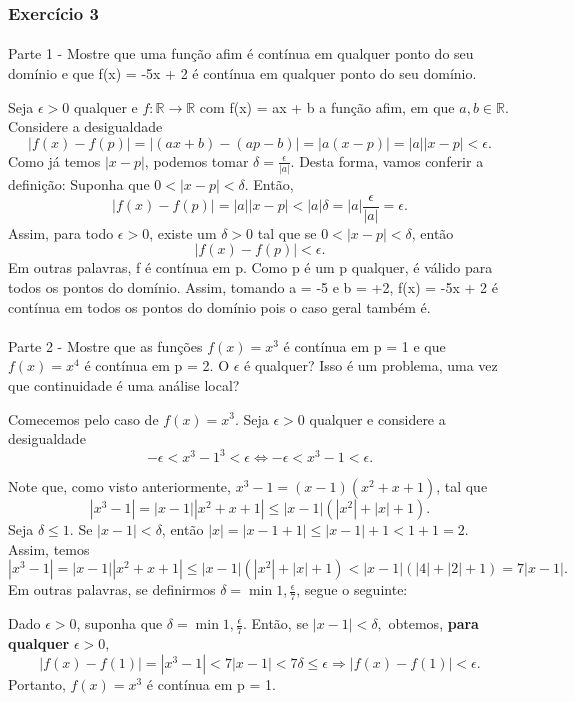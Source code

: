\documentclass[exercícios_de_cálculo.tex]{subfiles}
\begin{document}
\subsubsection{Exercício 3}
\paragraph{} Parte 1 - Mostre que uma função afim é contínua em qualquer ponto do seu dom\'inio e que f(x) = -5x + 2 é cont\'inua em qualquer ponto do seu dom\'inio.
\begin{proof*}
	Seja $\epsilon > 0$ qualquer e $f:\mathbb{R}\rightarrow\mathbb{R}$ com f(x) = ax + b a função afim, em que $a, b\in\mathbb{R}$. Considere a desigualdade
	$$
		|f(x) - f(p)| = |(ax + b) - (ap - b)| = |a(x - p)| = |a||x - p|< \epsilon.
	$$
	Como já temos $|x - p|$, podemos tomar $\delta = \frac{\epsilon}{|a|}.$ Desta forma, vamos conferir a definição: Suponha que $0 < |x - p| < \delta.$ Então,
	$$
		|f(x) - f(p)| = |a||x - p| < |a|\delta = |a|\frac{\epsilon}{|a|} = \epsilon.
	$$
	Assim, para todo $\epsilon > 0$, existe um $\delta > 0$ tal que se $0 < |x - p| < \delta$, então
	$$
		|f(x) - f(p)| < \epsilon.
	$$
	Em outras palavras, f é contínua em p. Como p é um p qualquer, é válido para todos os pontos do dom\'inio. Assim, tomando a = -5 e b = +2, f(x) = -5x + 2 é cont\'inua em todos os pontos do dom\'inio pois o caso geral também é.

	\qedsymbol
\end{proof*}

\paragraph{} Parte 2 - Mostre que as funções $f(x) = x^3$ é contínua em p = 1 e que $f(x) = x^4$ é cont\'inua em p = 2. O $\epsilon$ é qualquer? Isso é um problema, uma vez que continuidade é uma análise local?
\begin{sol*}
	Comecemos pelo caso de $f(x) = x^3$. Seja $\epsilon > 0$ qualquer e considere a desigualdade
	$$
		-\epsilon < x^3 - 1^3 < \epsilon \Leftrightarrow -\epsilon < x^3 - 1 < \epsilon.
	$$

	Note que, como visto anteriormente, $x^3 - 1 = (x - 1)(x^2 + x + 1)$, tal que
	$$
		|x^3 - 1| = |x - 1||x^2 + x + 1| \leq |x - 1|(|x^2| + |x| + 1).
	$$
	Seja $\delta \leq 1$. Se $|x - 1| < \delta$, então $|x| = |x - 1 + 1| \leq |x - 1| + 1 < 1 + 1 = 2.$ Assim, temos
	$$
		|x^3 - 1| = |x - 1||x^2 + x + 1| \leq |x - 1|(|x^2| + |x| + 1) < |x-1|(|4| + |2| + 1) = 7|x - 1|.
	$$
	Em outras palavras, se definirmos $\delta = \min{1,\frac{\epsilon}{7}}$, segue o seguinte:

	Dado $\epsilon > 0$, suponha que $\delta = \min{1, \frac{\epsilon}{7}}$. Então, se $|x - 1| < \delta,$ obtemos, \textbf{para qualquer} $\epsilon > 0$,
	$$
		|f(x) - f(1)| = |x^3 - 1| < 7|x - 1| < 7\delta \leq \epsilon \Rightarrow |f(x) - f(1)| < \epsilon.
	$$
	Portanto, $f(x) = x^3$ é contínua em p = 1.

\end{sol*}
\end{document}
